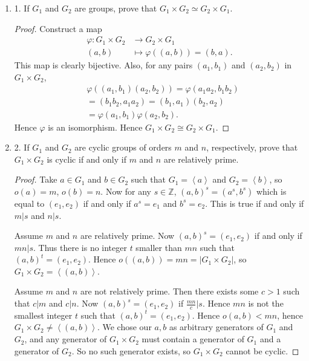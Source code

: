 \begin{enumerate}[resume]
	\item 1. If $G_1$ and $G_2$ are groups, prove that $G_1 \times G_2 \simeq G_2 \times G_1$.
\begin{proof}
	Construct a map
	\begin{align*}
		\varphi: G_1\times G_2 &\longrightarrow G_2\times G_1 \\
		(a,b) &\longmapsto \varphi((a,b)) = (b,a)
	.\end{align*}
	This map is clearly bijective. Also, for any pairs $(a_1, b_1)$ and $(a_2,b_2)$ in $G_1 \times G_2$, 
	\begin{align*}
		&\varphi\left( (a_1,b_1)(a_2,b_2) \right)  = \varphi(a_1a_2,b_1b_2) \\
		&= (b_1b_2,a_1a_2) = (b_1,a_1)(b_2,a_2)\\
		&=\varphi(a_1,b_1)\varphi(a_2,b_2)
	.\end{align*} 
	Hence $\varphi$ is an isomorphism. Hence $G_1\times G_2 \cong G_2 \times G_1$.
\end{proof}

	\item 2. If $G_1$ and $G_2$ are cyclic groups of orders $m$ and $n$, respectively, prove that $G_1 \times G_2$ is cyclic if and only if $m$ and $n$ are relatively prime.
\begin{proof}
	Take $a \in G_1$ and $b \in G_2$ such that $G_1 = \left\langle a \right\rangle $ and $G_2 = \left\langle b \right\rangle $, so $o(a) = m$, $o(b) = n$.
	Now for any $s \in \mathbb{Z}$, $(a,b)^{s} = (a^s, b^s)$ which is equal to $(e_1,e_2)$ if and only if  $a^s = e_1$ and $b^s = e_2$. This is true if and only if $m | s$ and $n | s$.

	Assume $m$ and $n$ are relatively prime. Now  $(a,b)^s = (e_1,e_2)$ if and only if $mn | s$. Thus there is no integer $t$ smaller than $mn$ such that $(a,b)^t = (e_1,e_2)$. Hence $o((a,b)) = mn = |G_1 \times G_2|$, so $G_1 \times G_2 = \left\langle (a,b) \right\rangle $.

	Assume $m$ and $n$ are not relatively prime. Then there exists some $c > 1$ such that $c | m $ and $c | n$. Now $(a,b)^s = (e_1,e_2)$ if $\frac{mn}{c}|s$. Hence $mn$  is not the smallest integer $t$ such that $(a,b)^t = (e_1,e_2)$. Hence $o(a,b)<mn$, hence $G_1 \times G_2 \neq \left\langle (a,b) \right\rangle $. We chose our $a,b$ as arbitrary generators of $G_1$ and $G_2$, and any generator of $G_1 \times G_2$ must contain a generator of $G_1$ and a generator of $G_2$. So no such generator exists, so $G_1 \times G_2$ cannot be cyclic.
\end{proof}


\end{enumerate}
